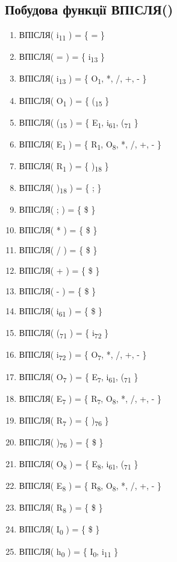 \subsection{Побудова функції ВПІСЛЯ()}

\begin{enumerate}
  \item ВПІСЛЯ( i\textsubscript{11} ) = \{ = \} 
  \item ВПІСЛЯ( = ) = \{ i\textsubscript{13} \}
  \item ВПІСЛЯ( i\textsubscript{13} ) = \{ O\textsubscript{1}, *, /, +, - \}
  \item ВПІСЛЯ( O\textsubscript{1} ) = \{ (\textsubscript{15} \}
  \item ВПІСЛЯ( (\textsubscript{15} ) = \{ E\textsubscript{1}, i\textsubscript{61}, (\textsubscript{71} \}  
  \item ВПІСЛЯ( E\textsubscript{1} ) = \{ R\textsubscript{1}, O\textsubscript{8}, *, /, +, - \} 
  \item ВПІСЛЯ( R\textsubscript{1} ) = \{ )\textsubscript{18} \}
  \item ВПІСЛЯ( )\textsubscript{18} ) = \{ ; \} 
  \item ВПІСЛЯ( ; ) = \{ \$ \} 

  \item ВПІСЛЯ( * ) = \{ \$ \} 
  \item ВПІСЛЯ( / ) = \{ \$ \} 
  \item ВПІСЛЯ( + ) = \{ \$ \} 
  \item ВПІСЛЯ( - ) = \{ \$ \} 
  \item ВПІСЛЯ( i\textsubscript{61} ) = \{ \$ \}  
 
  \item ВПІСЛЯ( (\textsubscript{71} ) = \{ i\textsubscript{72} \}
  \item ВПІСЛЯ( i\textsubscript{72} ) = \{ O\textsubscript{7}, *, /, +, - \} 
  \item ВПІСЛЯ( O\textsubscript{7} ) = \{ E\textsubscript{7}, i\textsubscript{61}, (\textsubscript{71} \}  
  \item ВПІСЛЯ( E\textsubscript{7} ) = \{ R\textsubscript{7}, O\textsubscript{8}, *, /, +, - \} 
  \item ВПІСЛЯ( R\textsubscript{7} ) = \{ )\textsubscript{76} \} 
  \item ВПІСЛЯ( )\textsubscript{76} ) = \{ \$ \}

  \item ВПІСЛЯ( O\textsubscript{8} ) = \{ E\textsubscript{8}, i\textsubscript{61}, (\textsubscript{71} \} 
  \item ВПІСЛЯ( E\textsubscript{8} ) = \{ R\textsubscript{8}, O\textsubscript{8}, *, /, +, - \} 
  \item ВПІСЛЯ( R\textsubscript{8} ) = \{ \$ \}

  \item ВПІСЛЯ( I\textsubscript{0} ) = \{ \$ \} 
  \item ВПІСЛЯ( h\textsubscript{0} ) = \{ I\textsubscript{0}, i\textsubscript{11} \} 
\end{enumerate}

